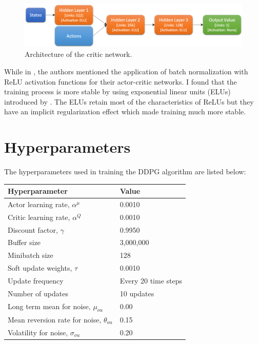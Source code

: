 \documentclass[12pt,twoside]{article}
\begin{document}
\begin{figure}[H]
	\begin{center}
		\includegraphics[width = 1\hsize]{./figures/Critic.png} 
		\caption{Architecture of the critic network.} %
		\label{fig:critic_architecture} %
	\end{center}
\end{figure}

While in \citep{lillicrap2015continuous}, the authors mentioned the application of batch normalization with ReLU activation functions for their actor-critic networks. I found that the training process is more stable by using exponential linear units (ELUs) introduced by \cite{clevert2015fast}. The ELUs retain most of the characteristics of ReLUs but they have an implicit regularization effect which made training much more stable.

\section{Hyperparameters}
The hyperparameters used in training the DDPG algorithm are listed below:
\begin{center}
	\begin{tabular}{|l|l|}
	\hline
		\textbf{Hyperparameter}							& \textbf{Value}\\\hline
		Actor learning rate, $\alpha^\mu$				& 0.0010 \\
		Critic learning rate, $\alpha^Q$					& 0.0010 \\
		Discount factor, $\gamma$						& 0.9950 \\
		Buffer size												& 3,000,000\\
		Minibatch size											& 128\\
		Soft update weights, $\tau$						& 0.0010\\
		Update frequency										& Every 20 time steps\\
		Number of updates									& 10 updates\\
		Long term mean for noise, $\mu_{ou}$		& 0.00\\
		Mean reversion rate for noise, $\theta_{ou}$	& 0.15\\
		Volatility for noise, $\sigma_{ou}$				& 0.20\\\hline
	\end{tabular}
\end{center}
\end{document}
